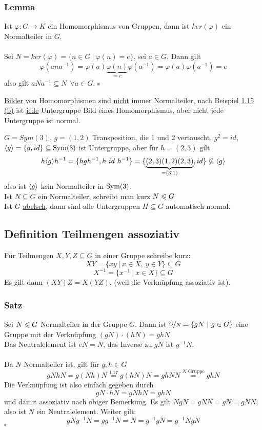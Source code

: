 \subsubsection*{Lemma}
Ist $\varphi: G \to K$ ein Homomorphismus von Gruppen, dann ist $ker(\varphi)$ ein Normalteiler in $G$.\\

\\
Sei $N=ker(\varphi)=\{n\in G~|~\varphi(n)=e\}$, sei $a\in G$. Dann gilt 
\[
\varphi(ana^{-1})=\varphi(a)\underbrace{\varphi(n)}_{=e}\varphi(a^{-1})=\varphi(a)\varphi(a^{-1})=e
\]
also gilt $aNa^{-1}\subseteq N~~\forall a\in G$.
\hfill $\square$

\uline{Bilder} von Homomorphismen sind \uline{nicht} immer Normalteiler, nach Beispiel \hyperref[sub:homomorphismen]{1.15 (b)} ist \uline{jede} Untergruppe Bild eines Homomorphismus, aber nicht jede Untergruppe ist normal.

$G=Sym(3)$, $g=(1,2)$ Transposition, die 1 und 2 vertauscht. $g^2=id$, $\langle g \rangle=\{g,id\}\subseteq \operatorname{Sym}(3)$ ist Untergruppe, aber für $h=(2,3)$ gilt 
\[
h\langle g \rangle h^{-1}=\{hgh^{-1}, h~id~h^{-1} \} = \{\underbrace{(2,3)(1,2)(2,3)}_{=(3,1)}, id \} \not\subseteq \langle g \rangle
\]
also ist $\langle g \rangle$ kein Normalteiler in $\operatorname{Sym}(3)$.\\

 Ist $N\subseteq G$ ein Normalteiler, schreibt man kurz $N\trianglelefteqslant G$\\

 Ist $G$ \uline{abelsch}, dann sind alle Untergruppen $H\subseteq G$ automatisch normal.

\subsection{Definition Teilmengen assoziativ}
\label{sub:teilmengen}
Für Teilmengen $X,Y,Z \subseteq G$ in einer Gruppe schreibe kurz:\\
\[XY=\{xy~|~x\in X,~y\in Y\}\subseteq G \]
\[X^{-1}=\{x^{-1}~|~x\in X \}\subseteq G \]
Es gilt dann $(XY)Z=X(YZ)$, (weil die Verknüpfung assoziativ ist).
\subsubsection*{Satz}
Sei $N\trianglelefteqslant G$ Normalteiler in der Gruppe $G$. Dann ist $\nicefrac{G}{N}=\{gN~|~g\in G \}$ eine Gruppe mit der Verknüpfung $(gN)\cdot (hN)=ghN$\\
Das Neutralelement ist $eN=N$, das Inverse zu $gN$ ist $g^{-1}N$.\\
\\
Da $N$ Normalteiler ist, gilt für $g,h \in G$
\[gNhN=g(Nh)N\stackrel{\hyperref[sub:normalteiler]{1.17}}{=}g(hN)N=ghNN\stackrel{N\text{ Gruppe}}{=}ghN \]
Die Verknüpfung ist also einfach gegeben durch
\[gN\cdot hN=gNhN=ghN \]
und damit assoziativ nach obiger Bemerkung. Es gilt $NgN=gNN=gN=gNN$, also ist $N$ ein Neutralelement. Weiter gilt:
\[gNg^{-1}N=gg^{-1}N=N=g^{-1}gN=g^{-1}NgN \]
\hfill $\square$

